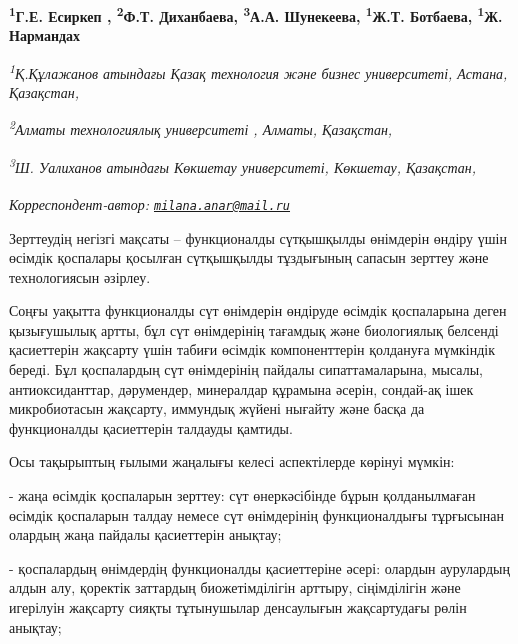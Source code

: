 
\begin{articleheader}

{\bfseries
\textsuperscript{1}Г.Е. Есиркеп\textsuperscript{\envelope } \authorid,
\textsuperscript{2}Ф.Т. Диханбаева\authorid,
\textsuperscript{3}А.А. Шунекеева\authorid,
\textsuperscript{1}Ж.Т. Ботбаева\authorid,
\textsuperscript{1}Ж. Нармандах\authorid}
\end{articleheader}

\begin{affiliation}
\emph{\textsuperscript{1}Қ.Құлажанов атындағы Қазақ технология және бизнес университеті, Астана, Қазақстан,}

\emph{\textsuperscript{2}Алматы технологиялық университеті , Алматы, Қазақстан,}

\emph{\textsuperscript{3}Ш. Уалиханов атындағы Көкшетау университеті, Көкшетау, Қазақстан,}

\raggedright \textsuperscript{\envelope }{\em Корреспондент-автор: \href{mailto:milana.anar@mail.ru}{\nolinkurl{milana.anar@mail.ru}}}
\end{affiliation}

Зерттеудің негізгі мақсаты -- функционалды сүтқышқылды өнімдерін өндіру
үшін өсімдік қоспалары қосылған сүтқышқылды тұздығының сапасын зерттеу
және технологиясын әзірлеу.

Соңғы уақытта функционалды сүт өнімдерін өндіруде өсімдік қоспаларына
деген қызығушылық артты, бұл сүт өнімдерінің тағамдық және биологиялық
белсенді қасиеттерін жақсарту үшін табиғи өсімдік компоненттерін
қолдануға мүмкіндік береді. Бұл қоспалардың сүт өнімдерінің пайдалы
сипаттамаларына, мысалы, антиоксиданттар, дәрумендер, минералдар
құрамына әсерін, сондай-ақ ішек микробиотасын жақсарту, иммундық жүйені
нығайту және басқа да функционалды қасиеттерін талдауды қамтиды.

Осы тақырыптың ғылыми жаңалығы келесі аспектілерде көрінуі мүмкін:

- жаңа өсімдік қоспаларын зерттеу: сүт өнеркәсібінде бұрын қолданылмаған
өсімдік қоспаларын талдау немесе сүт өнімдерінің функционалдығы
тұрғысынан олардың жаңа пайдалы қасиеттерін анықтау;

- қоспалардың өнімдердің функционалды қасиеттеріне әсері: олардын
аурулардың алдын алу, қоректік заттардың биожетімділігін арттыру,
сіңімділігін және игерілуін жақсарту сияқты тұтынушылар денсаулығын
жақсартудағы рөлін анықтау;

